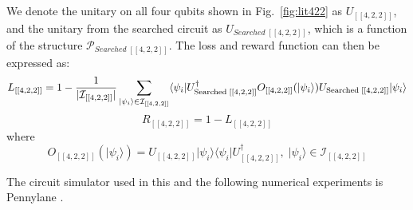\documentclass[a4paper,onecolumn,11pt]{quantumarticle}
\begin{document}
We denote the unitary on all four qubits shown in Fig.~\ref{fig:lit422} as $U_{[[4,2,2]]}$, and the unitary from the searched circuit as $U_{Searched\;[[4,2,2]]}$, which is a function of the structure $\mathcal{P}_{Searched\;[[4,2,2]]}$. The loss and reward function can then be expressed as:
\begin{equation}
    L_{[[4,2,2]]} = 1-\frac{1}{\vert \mathcal{I}_{[[4,2,2]]} \vert}\sum_{\vert \psi_i\rangle\in  \mathcal{I}_{[[4,2,2]]}} \langle \psi_i \vert U_{\rm Searched\;[[4,2,2]]}^{\dagger} O_{[[4,2,2]]}(\vert \psi_i\rangle)  U_{\rm Searched\;[[4,2,2]]} \vert \psi_i\rangle
\end{equation}
\begin{equation}
    R_{[[4,2,2]]} = 1-L_{[[4,2,2]]}
\end{equation}
where
\begin{equation}
    O_{[[4,2,2]]}(\vert \psi_i\rangle) = U_{[[4,2,2]]} \vert \psi_i\rangle \langle \psi_i \vert U_{[[4,2,2]]}^{\dagger},\; \vert \psi_i\rangle\in  \mathcal{I}_{[[4,2,2]]}
\end{equation}



The circuit simulator used in this and the following numerical experiments is Pennylane \cite{bergholm2020pennylane}.
\end{document}
